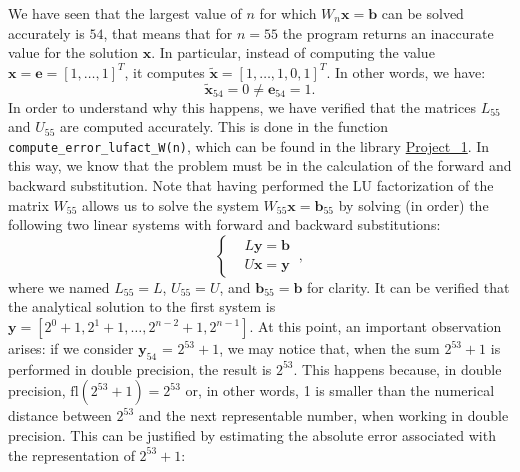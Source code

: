 \documentclass[a4paper,11pt]{article}
\begin{document}
\noindent We have seen that the largest value of $n$ for which $W_n \textbf{x} = \textbf{b}$ can be solved accurately is $54$, that means that for $n=55$ the program returns an inaccurate value for the solution $\textbf{x}$. In particular, instead of computing the value $\textbf{x} = \textbf{e} = [1,\dots,1]^T$, it computes $\tilde{\textbf{x}} = [1,\dots,1,0,1]^T$. In other words, we have:
\begin{equation}\label{key}
	\tilde{\textbf{x}}_{54} = 0 \neq \textbf{e}_{54} = 1.
\end{equation}
In order to understand why this happens, we have verified that the matrices $L_{55}$ and $U_{55}$ are computed accurately. This is done in the function \texttt{compute_error_lufact_W(n)}, which can be found in the library \href{https://github.com/nunziacerrato/Numerical_Analysis_Optimization/blob/main/Project_1/Project_1.py}{Project\_1}. In this way, we know that the problem must be in the calculation of the forward and backward substitution. Note that having performed the LU factorization of the matrix $W_{55}$ allows us to solve the system $W_{55} \textbf{x} = \textbf{b}_{55}$ by solving (in order) the following two linear systems with forward and backward substitutions:
\begin{equation}\label{key}
	\left\lbrace \begin{split}
		& L \textbf{y} = \textbf{b} \\
		& U \textbf{x} = \textbf{y}
	\end{split} \right. \ ,
\end{equation}
where we named $L_{55} = L$, $U_{55} = U$, and $\textbf{b}_{55} = \textbf{b}$ for clarity.
It can be verified that the analytical solution to the first system is $\textbf{y} = [2^0 + 1, 2^1 + 1, \dots,2^{n-2}+1, 2^{n-1}]$. At this point, an important observation arises: if we consider $\textbf{y}_{54}$ = $2^{53} + 1 $, we may notice that, when the sum $2^{53} + 1$ is performed in double precision, the result is $2^{53}$. This happens because, in double precision, $\text{fl}(2^{53}+1)=2^{53}$ or, in other words, 1 is smaller than the numerical distance between $2^{53}$ and the next representable number, when working in double precision. This can be justified by estimating the absolute error associated with the representation of $2^{53}+1$:
\end{document}
